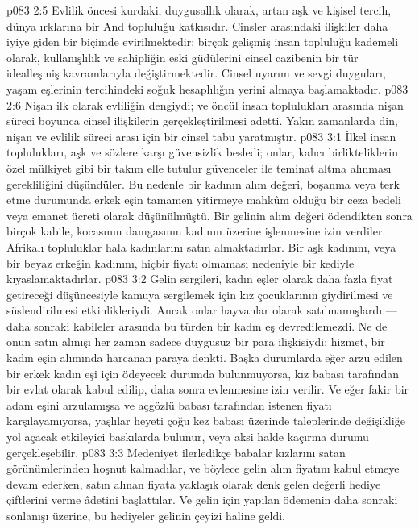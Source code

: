 \vs p083 2:5 Evlilik öncesi kurdaki, duygusallık olarak, artan aşk ve kişisel tercih, dünya ırklarına bir And topluluğu katkısıdır. Cinsler arasındaki ilişkiler daha iyiye giden bir biçimde evirilmektedir; birçok gelişmiş insan topluluğu kademeli olarak, kullanışlılık ve sahipliğin eski güdülerini cinsel cazibenin bir tür idealleşmiş kavramlarıyla değiştirmektedir. Cinsel uyarım ve sevgi duyguları, yaşam eşlerinin tercihindeki soğuk hesaplılığın yerini almaya başlamaktadır.
\vs p083 2:6 Nişan ilk olarak evliliğin dengiydi; ve öncül insan toplulukları arasında nişan süreci boyunca cinsel ilişkilerin gerçekleştirilmesi adetti. Yakın zamanlarda din, nişan ve evlilik süreci arası için bir cinsel tabu yaratmıştır.
\vs p083 3:1 İlkel insan toplulukları, aşk ve sözlere karşı güvensizlik besledi; onlar, kalıcı birlikteliklerin özel mülkiyet gibi bir takım elle tutulur güvenceler ile teminat altına alınması gerekliliğini düşündüler. Bu nedenle bir kadının alım değeri, boşanma veya terk etme durumunda erkek eşin tamamen yitirmeye mahkûm olduğu bir ceza bedeli veya emanet ücreti olarak düşünülmüştü. Bir gelinin alım değeri ödendikten sonra birçok kabile, kocasının damgasının kadının üzerine işlenmesine izin verdiler. Afrikalı topluluklar hala kadınlarını satın almaktadırlar. Bir aşk kadınını, veya bir beyaz erkeğin kadınını, hiçbir fiyatı olmaması nedeniyle bir kediyle kıyaslamaktadırlar.
\vs p083 3:2 Gelin sergileri, kadın eşler olarak daha fazla fiyat getireceği düşüncesiyle kamuya sergilemek için kız çocuklarının giydirilmesi ve süslendirilmesi etkinlikleriydi. Ancak onlar hayvanlar olarak satılmamışlardı --- daha sonraki kabileler arasında bu türden bir kadın eş devredilemezdi. Ne de onun satın alınışı her zaman sadece duygusuz bir para ilişkisiydi; hizmet, bir kadın eşin alımında harcanan paraya denkti. Başka durumlarda eğer arzu edilen bir erkek kadın eşi için ödeyecek durumda bulunmuyorsa, kız babası tarafından bir evlat olarak kabul edilip, daha sonra evlenmesine izin verilir. Ve eğer fakir bir adam eşini arzulamışsa ve açgözlü babası tarafından istenen fiyatı karşılayamıyorsa, yaşlılar heyeti çoğu kez babası üzerinde taleplerinde değişikliğe yol açacak etkileyici baskılarda bulunur, veya aksi halde kaçırma durumu gerçekleşebilir.
\vs p083 3:3 Medeniyet ilerledikçe babalar kızlarını satan görünümlerinden hoşnut kalmadılar, ve böylece gelin alım fiyatını kabul etmeye devam ederken, satın alınan fiyata yaklaşık olarak denk gelen değerli hediye çiftlerini verme âdetini başlattılar. Ve gelin için yapılan ödemenin daha sonraki sonlanışı üzerine, bu hediyeler gelinin çeyizi haline geldi.
